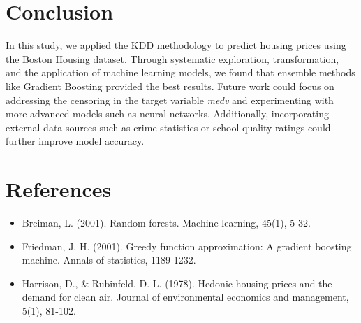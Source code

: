 \documentclass[12pt]{article}
\begin{document}
\section{Conclusion}
In this study, we applied the KDD methodology to predict housing prices using the Boston Housing dataset. Through systematic exploration, transformation, and the application of machine learning models, we found that ensemble methods like Gradient Boosting provided the best results. Future work could focus on addressing the censoring in the target variable \textit{medv} and experimenting with more advanced models such as neural networks. Additionally, incorporating external data sources such as crime statistics or school quality ratings could further improve model accuracy.

\section{References}
\begin{itemize}
    \item Breiman, L. (2001). Random forests. Machine learning, 45(1), 5-32.
    \item Friedman, J. H. (2001). Greedy function approximation: A gradient boosting machine. Annals of statistics, 1189-1232.
    \item Harrison, D., \& Rubinfeld, D. L. (1978). Hedonic housing prices and the demand for clean air. Journal of environmental economics and management, 5(1), 81-102.
\end{itemize}
\end{document}
